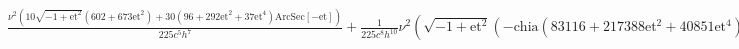 \documentclass{article}
\begin{document}
\noindent\(\text{}\)

\begin{doublespace}
\noindent\(\frac{\nu ^2 \left(10 \sqrt{-1+\text{et}^2} \left(602+673 \text{et}^2\right)+30 \left(96+292 \text{et}^2+37 \text{et}^4\right) \text{ArcSec}[-\text{et}]\right)}{225
c^5 h^7}+\frac{1}{225 c^8 h^{10}}\nu ^2 \left(\sqrt{-1+\text{et}^2} \left(-\text{chia} \left(83116+217388 \text{et}^2+40851 \text{et}^4\right) \delta
+4 \text{chis} \left(-26536-5757 \delta ^2+10426 \eta +25720 \nu \right)+\text{chis} \text{et}^2 \left(-304892-87504 \delta ^2+94772 \eta +369640
\nu +\text{et}^2 \left(-69234-28383 \delta ^2+444 \eta +113380 \nu \right)\right)\right)-15 \left(\text{chia} \left(2384+13416 \text{et}^2+6762 \text{et}^4+195
\text{et}^6\right) \delta +\text{chis} \left(3 \text{et}^4 \left(3472+1218 \delta ^2-580 \eta +\text{et}^2 \left(134+69 \delta ^2+44 \eta -268 \nu
\right)-4976 \nu \right)+8 \text{et}^2 \left(2274+597 \delta ^2-792 \eta -2564 \nu \right)+16 \left(188+39 \delta ^2-74 \eta -176 \nu \right)\right)\right)
\text{ArcSec}[-\text{et}]\right)\)
\end{doublespace}
\end{document}
